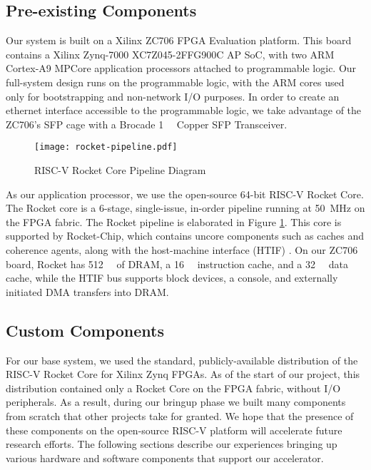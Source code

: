 \subsection{Pre-existing Components}
    Our system is built on a Xilinx ZC706 FPGA Evaluation platform. This board
    contains a Xilinx Zynq-7000 XC7Z045-2FFG900C AP SoC, with two ARM Cortex-A9
    MPCore application processors attached to programmable logic. Our full-system
    design runs on the programmable logic, with the ARM cores used only for 
    bootstrapping and non-network I/O purposes. In order to create an ethernet interface accessible
    to the programmable logic, we take advantage of the ZC706's SFP cage with a 
    Brocade \SI{1}{\giga\bit} Copper SFP Transceiver.

    
\begin{figure}[t]
\begin{center}
\texttt{[image: rocket-pipeline.pdf]}
\caption{RISC-V Rocket Core Pipeline Diagram}
\label{fig:rocketpipe}
\end{center}
\end{figure}


    As our application processor, we use the open-source 64-bit RISC-V Rocket Core.
    The Rocket core is a
    6-stage, single-issue, in-order pipeline running at \SI{50}{\mega\hertz} on the FPGA fabric. The
    Rocket pipeline is elaborated in Figure \ref{fig:rocketpipe}. This 
    core is supported by Rocket-Chip, which contains uncore components such as
    caches and coherence agents, along with the host-machine interface (HTIF) \cite{rocket}.
    On our ZC706 board, Rocket has \SI{512}{\mebi\byte} of DRAM, a \SI{16}{\kibi\byte} instruction cache, and a
    \SI{32}{\kibi\byte} data cache, while the HTIF bus supports block devices, a console, and
    externally initiated DMA transfers into DRAM.

\subsection{Custom Components}
    For our base system, we used the standard, publicly-available 
    distribution of the RISC-V Rocket Core for Xilinx Zynq FPGAs. As of the 
    start of our project, this distribution contained only a Rocket Core on
    the FPGA fabric, without I/O peripherals. As a result, during our bringup phase 
    we built many components from scratch that other projects take for granted. We hope that
    the presence of these components on the open-source RISC-V platform
    will accelerate future research efforts. The following sections describe our
    experiences bringing up various hardware and software components that support
    our accelerator.

